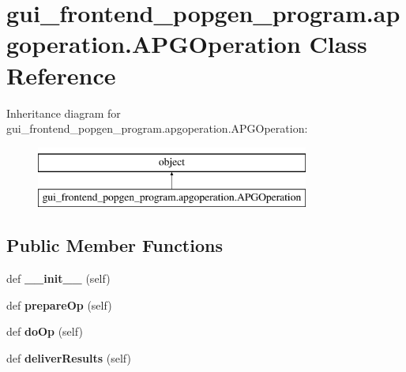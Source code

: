 \hypertarget{classgui__frontend__popgen__program_1_1apgoperation_1_1APGOperation}{}\section{gui\+\_\+frontend\+\_\+popgen\+\_\+program.\+apgoperation.\+A\+P\+G\+Operation Class Reference}
\label{classgui__frontend__popgen__program_1_1apgoperation_1_1APGOperation}
Inheritance diagram for gui\+\_\+frontend\+\_\+popgen\+\_\+program.\+apgoperation.\+A\+P\+G\+Operation\+:\begin{figure}[H]
\begin{center}
\leavevmode
\includegraphics[height=2.000000cm]{classgui__frontend__popgen__program_1_1apgoperation_1_1APGOperation}
\end{center}
\end{figure}
\subsection*{Public Member Functions}
\begin{DoxyCompactItemize}
\item 
def {\bfseries \+\_\+\+\_\+init\+\_\+\+\_\+} (self)\hypertarget{classgui__frontend__popgen__program_1_1apgoperation_1_1APGOperation_afc397db8adcc2bec4674da7262e8a396}{}\label{classgui__frontend__popgen__program_1_1apgoperation_1_1APGOperation_afc397db8adcc2bec4674da7262e8a396}

\item 
def {\bfseries prepare\+Op} (self)\hypertarget{classgui__frontend__popgen__program_1_1apgoperation_1_1APGOperation_a180f6baaeaee3b461472180b7449a561}{}\label{classgui__frontend__popgen__program_1_1apgoperation_1_1APGOperation_a180f6baaeaee3b461472180b7449a561}

\item 
def {\bfseries do\+Op} (self)\hypertarget{classgui__frontend__popgen__program_1_1apgoperation_1_1APGOperation_ab6bbfcbcbbac6a9d98c5e768027d1645}{}\label{classgui__frontend__popgen__program_1_1apgoperation_1_1APGOperation_ab6bbfcbcbbac6a9d98c5e768027d1645}

\item 
def {\bfseries deliver\+Results} (self)\hypertarget{classgui__frontend__popgen__program_1_1apgoperation_1_1APGOperation_a847c2124b43acad2507ecc8807484e4d}{}\label{classgui__frontend__popgen__program_1_1apgoperation_1_1APGOperation_a847c2124b43acad2507ecc8807484e4d}

\end{DoxyCompactItemize}



